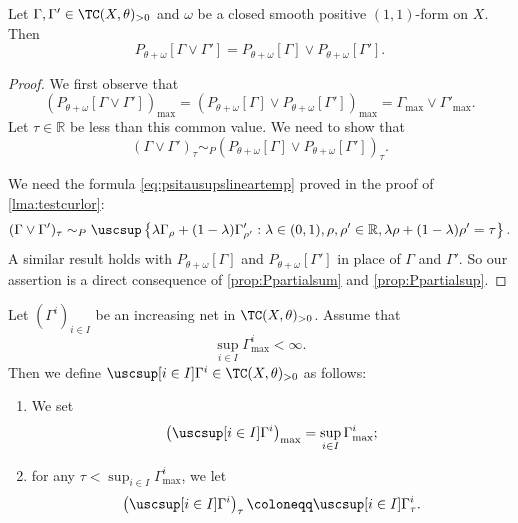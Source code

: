 \begin{lemma}\label{lma:testcurlorPthetapomega}
    Let $\Gamma,\Gamma'\in \TC(X,\theta)_{>0}$ and $\omega$ be a closed smooth positive $(1,1)$-form on $X$. Then
    \[
    P_{\theta+\omega}[\Gamma\lor \Gamma']=P_{\theta+\omega}[\Gamma]\lor P_{\theta+\omega}[\Gamma'].
    \]
\end{lemma}
\begin{proof}
    We first observe that
    \[
    \left(P_{\theta+\omega}[\Gamma\lor \Gamma']\right)_{\max}=\left( P_{\theta+\omega}[\Gamma]\lor P_{\theta+\omega}[\Gamma']\right)_{\max}=\Gamma_{\max}\lor \Gamma'_{\max}.
    \]
    Let $\tau\in \mathbb{R}$ be less than this common value. We need to show that
    \[
    (\Gamma\lor \Gamma')_{\tau}\sim_P \left(P_{\theta+\omega}[\Gamma]\lor P_{\theta+\omega}[\Gamma'] \right)_{\tau}.
    \]

    We need the formula \eqref{eq:psitausupslineartemp} proved in the proof of \cref{lma:testcurlor}:
    \[
    \begin{split}
    (\Gamma\lor \Gamma')_{\tau}\sim_P\uscsup\left\{\lambda \Gamma_{\rho}+(1-\lambda)\Gamma'_{\rho'}: \lambda \in (0,1),\rho,\rho'\in \mathbb{R},\lambda\rho+(1-\lambda)\rho'=\tau \right\}.
    \end{split}
    \]
    A similar result holds with $P_{\theta+\omega}[\Gamma]$ and $P_{\theta+\omega}[\Gamma']$ in place of $\Gamma$ and $\Gamma'$. So our assertion is a direct consequence of \cref{prop:Ppartialsum} and \cref{prop:Ppartialsup}.
\end{proof}


\begin{definition}\label{def:testcursup}
    Let $(\Gamma^i)_{i\in I}$ be an increasing net in $\TC(X,\theta)_{>0}$. Assume that
    \begin{equation}\label{eq:Gammaisupfinite1}
        \sup_{i\in I}\Gamma^{i}_{\max}<\infty.
    \end{equation}
    Then we define $\uscsup[i\in I] \Gamma^{i}\in \TC(X,\theta)_{>0}$ as follows:
    \begin{enumerate}
        \item\label{itm:def:testcursup:1} We set
        \[
            \left( \uscsup[i\in I] \Gamma^{i} \right)_{\max}=\sup_{i\in I}\Gamma^{i}_{\max};
        \]
        \item\label{itm:def:testcursup:2} for any $\tau< \sup_{i\in I}\Gamma^{i}_{\max}$, we let
        \[
        \left( \uscsup[i\in I] \Gamma^{i} \right)_{\tau}\coloneqq \uscsup[i\in I] \Gamma^{i}_{\tau}.
        \]
    \end{enumerate}
\end{definition}

